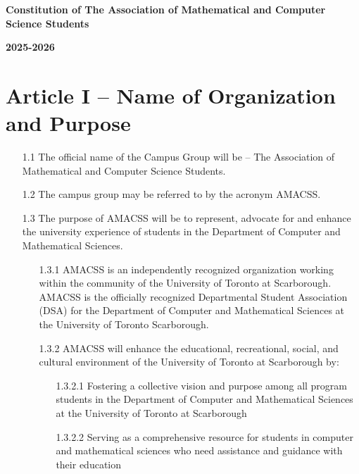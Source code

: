 \documentclass[12pt,a4paper]{article}
\begin{document}
\begin{center}
{\Large\textbf{Constitution of The Association of Mathematical and Computer Science Students}}

\vspace{0.5cm}
{\large\textbf{2025-2026}}
\end{center}

\vspace{1cm}

\section*{Article I – Name of Organization and Purpose}

\begin{enumerate}
\item[1.1] The official name of the Campus Group will be – The Association of Mathematical and Computer Science Students.

\item[1.2] The campus group may be referred to by the acronym AMACSS.

\item[1.3] The purpose of AMACSS will be to represent, advocate for and enhance the university experience of students in the Department of Computer and Mathematical Sciences.

\begin{enumerate}
\item[1.3.1] AMACSS is an independently recognized organization working within the community of the University of Toronto at Scarborough. AMACSS is the officially recognized Departmental Student Association (DSA) for the Department of Computer and Mathematical Sciences at the University of Toronto Scarborough.

\item[1.3.2] AMACSS will enhance the educational, recreational, social, and cultural environment of the University of Toronto at Scarborough by:

\begin{enumerate}
\item[1.3.2.1] Fostering a collective vision and purpose among all program students in the Department of Computer and Mathematical Sciences at the University of Toronto at Scarborough

\item[1.3.2.2] Serving as a comprehensive resource for students in computer and mathematical sciences who need assistance and guidance with their education


\end{enumerate}
\end{enumerate}
\end{enumerate}
\end{document}
